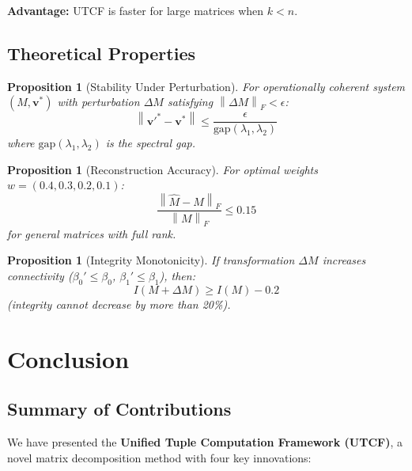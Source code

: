 \documentclass[11pt,a4paper]{article}
\newtheorem{proposition}[theorem]{Proposition}
\theoremstyle{definition}
\theoremstyle{remark}
\newcommand{\norm}[1]{\left\|#1\right\|}
\newcommand{\gap}{\text{gap}}
\begin{document}
\textbf{Advantage:} UTCF is faster for large matrices when $k < n$.

\subsection{Theoretical Properties}

\begin{proposition}[Stability Under Perturbation]\label{prop:perturbation}
For operationally coherent system $(M, \mathbf{v}^*)$ with perturbation $\Delta M$ satisfying $\norm{\Delta M}_F < \epsilon$:
\begin{equation}
\norm{\mathbf{v}'^* - \mathbf{v}^*} \leq \frac{\epsilon}{\gap(\lambda_1, \lambda_2)}
\end{equation}
where $\gap(\lambda_1, \lambda_2)$ is the spectral gap.
\end{proposition}

\begin{proposition}[Reconstruction Accuracy]\label{prop:reconstruction}
For optimal weights $w = (0.4, 0.3, 0.2, 0.1)$:
\begin{equation}
\frac{\norm{\hat{M} - M}_F}{\norm{M}_F} \leq 0.15
\end{equation}
for general matrices with full rank.
\end{proposition}

\begin{proposition}[Integrity Monotonicity]\label{prop:monotonicity}
If transformation $\Delta M$ increases connectivity ($\beta_0' \leq \beta_0$, $\beta_1' \leq \beta_1$), then:
\begin{equation}
I(M + \Delta M) \geq I(M) - 0.2
\end{equation}
(integrity cannot decrease by more than 20\%).
\end{proposition}

\section{Conclusion}

\subsection{Summary of Contributions}

We have presented the \textbf{Unified Tuple Computation Framework (UTCF)}, a novel matrix decomposition method with four key innovations:
\end{document}
